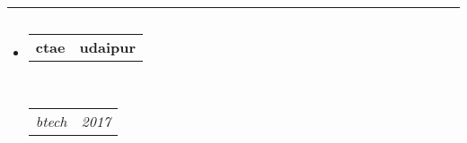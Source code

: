 \documentclass[11pt, letterpaper]{article}
\makeatletter
\newcommand{\splitrow}[2]
{\begin{tabular*}{\linewidth}{l@{\extracolsep{\fill}}r}
	#1 &
	#2 \\
\end{tabular*}}
\makeatother
\begin{document}
\hrule
\vspace{-0.4em}
\subsection*{}

\begin{itemize}
	\parskip=0.1em

	\item 
	\splitrow
		{\textbf{ ctae }}
		{\textbf{ udaipur }}
	\\
	\splitrow
		{\emph{ btech }}
		{\emph{ 2017 }}

\end{itemize}
\end{document}
